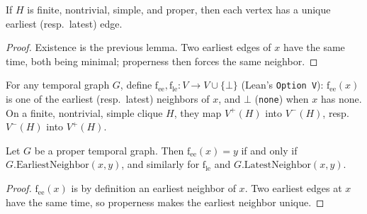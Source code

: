 \begin{lemma}
  \label{lem:earliestEdge-unique-proper-clique}
  \leanok
  If $H$ is finite, nontrivial, simple, and proper, then each vertex has a
  unique earliest (resp.\ latest) edge.
\end{lemma}

\begin{proof}
  \leanok
  Existence is the previous lemma. Two earliest edges of $x$ have the same time, both being minimal; properness then forces the same neighbor.
\end{proof}

\begin{definition}
  \label{def:neighbor-functions}
  \leanok
  For any temporal graph $G$, define $\mathrm{f_{ee}}, \mathrm{f_{le}} : V \to
  V \cup \{\bot\}$ (Lean's \texttt{Option V}): $\mathrm{f_{ee}}(x)$ is one of the
  earliest (resp.\ latest) neighbors of $x$, and $\bot$ (\texttt{none}) when
  $x$ has none. On a finite, nontrivial, simple clique $H$, they map $V^+(H)$
  into $V^-(H)$, resp.\ $V^-(H)$ into $V^+(H)$.
\end{definition}

\begin{lemma}
  \label{lem:neighbor-fn-eq}
  \leanok
  Let $G$ be a proper temporal graph. Then $\mathrm{f_{ee}}(x) = y$ if and only if
  $G.\mathrm{EarliestNeighbor}(x, y)$, and similarly for $\mathrm{f_{le}}$ and
  $G.\mathrm{LatestNeighbor}(x,y)$.
\end{lemma}

\begin{proof}
  \leanok
  $\mathrm{f_{ee}}(x)$ is by definition an earliest neighbor of $x$. Two earliest edges at $x$ have the same time, so properness makes the earliest neighbor unique.
\end{proof}

